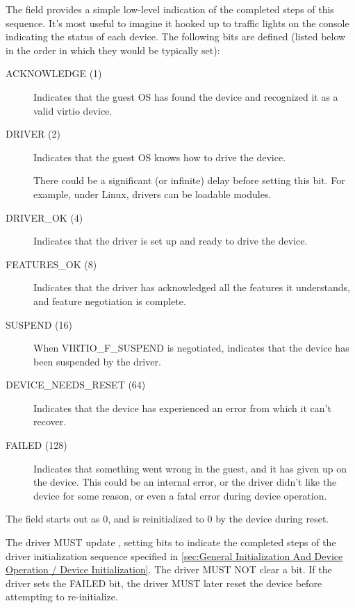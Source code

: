 The  field provides a simple low-level
indication of the completed steps of this sequence.
It's most useful to imagine it hooked up to traffic
lights on the console indicating the status of each device.  The
following bits are defined (listed below in the order in which
they would be typically set):
\begin{description}
\item[ACKNOWLEDGE (1)] Indicates that the guest OS has found the
  device and recognized it as a valid virtio device.

\item[DRIVER (2)] Indicates that the guest OS knows how to drive the
  device.
  \begin{note}
    There could be a significant (or infinite) delay before setting
    this bit.  For example, under Linux, drivers can be loadable modules.
  \end{note}

\item[DRIVER_OK (4)] Indicates that the driver is set up and ready to
  drive the device.

\item[FEATURES_OK (8)] Indicates that the driver has acknowledged all the
  features it understands, and feature negotiation is complete.

\item[SUSPEND (16)] When VIRTIO_F_SUSPEND is negotiated, indicates that the
  device has been suspended by the driver.

\item[DEVICE_NEEDS_RESET (64)] Indicates that the device has experienced
  an error from which it can't recover.

\item[FAILED (128)] Indicates that something went wrong in the guest,
  and it has given up on the device. This could be an internal
  error, or the driver didn't like the device for some reason, or
  even a fatal error during device operation.
\end{description}

The  field starts out as 0, and is reinitialized to 0 by
the device during reset.

The driver MUST update ,
setting bits to indicate the completed steps of the driver
initialization sequence specified in
\ref{sec:General Initialization And Device Operation / Device
Initialization}.
The driver MUST NOT clear a
 bit.  If the driver sets the FAILED bit,
the driver MUST later reset the device before attempting to re-initialize.

